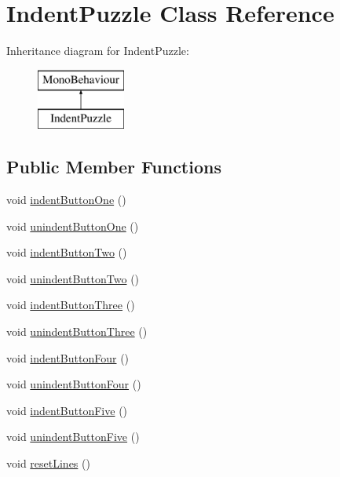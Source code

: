 \hypertarget{class_indent_puzzle}{}\section{Indent\+Puzzle Class Reference}
\label{class_indent_puzzle}
Inheritance diagram for Indent\+Puzzle\+:\begin{figure}[H]
\begin{center}
\leavevmode
\includegraphics[height=2.000000cm]{class_indent_puzzle}
\end{center}
\end{figure}
\subsection*{Public Member Functions}
\begin{DoxyCompactItemize}
\item 
void \hyperlink{class_indent_puzzle_a215e6d882d3f871e695a6ee0d21378a2}{indent\+Button\+One} ()
\item 
void \hyperlink{class_indent_puzzle_ab75ac1bbe900470f0eb4ab3040bb18e5}{unindent\+Button\+One} ()
\item 
void \hyperlink{class_indent_puzzle_a4f628be71f4f814df6684303d10fb121}{indent\+Button\+Two} ()
\item 
void \hyperlink{class_indent_puzzle_a3c861e4dffc0b8c5241b8f64d073679b}{unindent\+Button\+Two} ()
\item 
void \hyperlink{class_indent_puzzle_a1d0b6f844214804ae157af4be1fb780d}{indent\+Button\+Three} ()
\item 
void \hyperlink{class_indent_puzzle_a66535f1875dc7b668f1c54e122914e33}{unindent\+Button\+Three} ()
\item 
void \hyperlink{class_indent_puzzle_af180ebdc9af7a5550a7d2099c4c05eea}{indent\+Button\+Four} ()
\item 
void \hyperlink{class_indent_puzzle_a3a68645b408c0649e237fa77c79ffa15}{unindent\+Button\+Four} ()
\item 
void \hyperlink{class_indent_puzzle_a6d494b8306dfbdc444d67032f6dbb275}{indent\+Button\+Five} ()
\item 
void \hyperlink{class_indent_puzzle_a4aabfa2cd19fadbb5d2e13d4e6defa1d}{unindent\+Button\+Five} ()
\item 
void \hyperlink{class_indent_puzzle_a415f779d82c83fb96cde45421a684f43}{reset\+Lines} ()
\end{DoxyCompactItemize}
